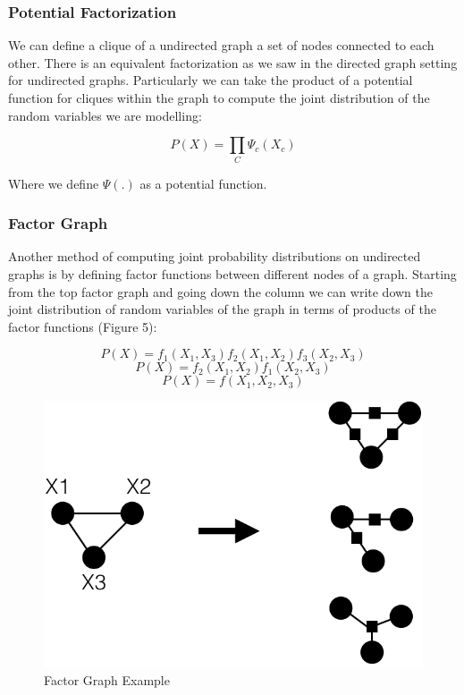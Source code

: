 \documentclass[12pt]{report}
\begin{document}
\subsubsection*{Potential Factorization}

We can define a clique of a undirected graph a set of nodes connected to each other. There is an equivalent factorization as we saw in the directed graph setting for undirected graphs. Particularly we can take the product of a potential function for cliques within the graph to compute the joint distribution of the random variables we are modelling:

$$P(X) = \prod_C \Psi_{c}(X_c)$$

Where we define $\Psi(.)$ as a potential function. 

\subsubsection*{Factor Graph}

Another method of computing joint probability distributions on undirected graphs is by defining factor functions between different nodes of a graph. Starting from the top factor graph and going down the column we can write down the joint distribution of random variables of the graph in terms of products of the factor functions (Figure 5):

$$P(X) = f_{1}(X_1, X_3) f_{2}(X_1, X_2) f_{3}(X_2, X_3)$$
$$P(X) = f_{2}(X_1, X_2) f_{1}(X_2, X_3)$$
$$P(X) = f(X_1, X_2, X_3)$$

\newpage

\begin{figure}[h!]
\centering
\includegraphics[width=\textwidth]{figures/lec17_factor.png} 
\caption{Factor Graph Example} 
\end{figure} 
\end{document}
